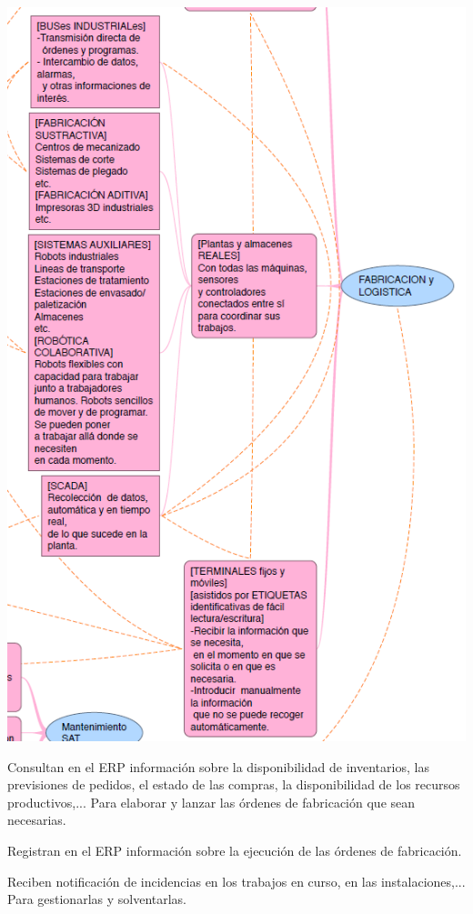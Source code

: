\documentclass[spanish,12pt,a4paper,final,oneside]{book}
\begin{document}
\\ \includegraphics[width=\textwidth]{subesquema - fabricacion03}

Consultan en el ERP información sobre la disponibilidad de inventarios, las previsiones de pedidos, el estado de las compras, la disponibilidad de los recursos productivos,... Para elaborar y lanzar las órdenes de fabricación que sean necesarias.

Registran en el ERP información sobre la ejecución de las órdenes de fabricación.

Reciben notificación de incidencias en los trabajos en curso, en las instalaciones,... Para gestionarlas y solventarlas.
\end{document}
